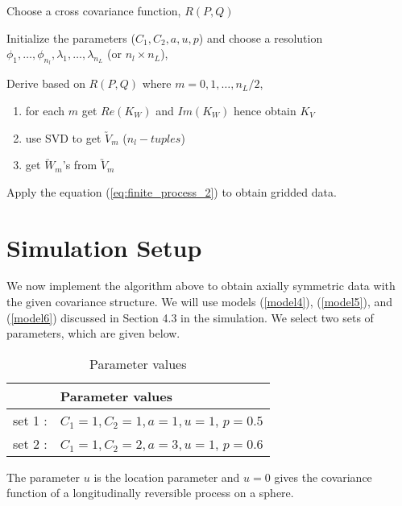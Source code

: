	  \begin{algorithm} \label{pseudo_code} \hfill
		\begin{itemize}
		\end{itemize}
	\end{algorithm}
	
	\section{Simulation Setup}
We now implement the algorithm above to obtain axially symmetric data with the given covariance structure. We will use models (\ref{model4}), (\ref{model5}), and (\ref{model6}) discussed in Section 4.3 in the simulation. We select two sets of parameters, which are given below.
\begin{table}[H]
\centering
\caption[Parameter Values]{Parameter values }
\vskip 16pt
\begin{tabular}{|l|l|}
 \hline
 & Parameter values\\ \hline
set 1 : & $C_1 = 1, C_2 = 1, a = 1, u = 1$, $p=0.5$ \\
set 2 : & $C_1 = 1, C_2 = 2, a = 3, u = 1$, $p=0.6$ \\ \hline
\end{tabular}
\end{table}
The parameter $u$ is the location parameter and $u=0$ gives the covariance function of a longitudinally reversible process on a sphere. 

